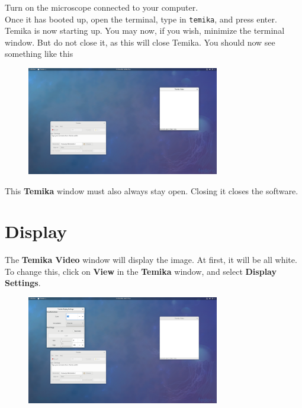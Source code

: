 \documentclass{report}
\begin{document}
Turn on the microscope connected to your computer.
\\
Once it has booted up, open the terminal, type in \verb|temika|, and press enter.
\\
Temika is now starting up. You may now, if you wish, minimize the terminal window. But do not close it, as this will close Temika. You should now see something like this\\

\begin{figure}[h!]
\centering
\includegraphics[width=0.75\textwidth]{just_opened}
\end{figure}

This \textbf{Temika} window must also always stay open. Closing it closes the software.\\



\newpage

\section{Display}

The \textbf{Temika Video} window will display the image. At first, it will be all white. To change this, click on \textbf{View} in the \textbf{Temika} window, and select \textbf{Display Settings}.

\begin{figure}[h!]
\centering
\includegraphics[width=0.75\textwidth]{display}
\end{figure}
\end{document}
